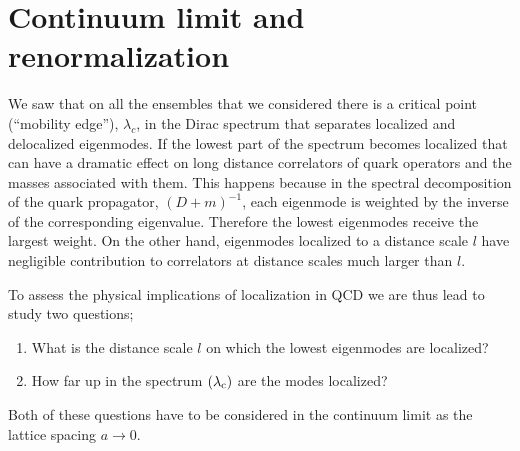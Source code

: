 \documentclass[twocolumn, prd, preprintnumbers, amsmath,
  amssymb, showpacs, floatfix]{revtex4-1}
\newcommand{\msub}[1]{\ensuremath _{\mbox{\scriptsize #1}}}
\begin{document}


\section{Continuum limit and renormalization}
    \label{se:Clar}

We saw that on all the ensembles that we considered there is a critical point
(``mobility edge''), $\lambda_c$, in the Dirac spectrum that separates
localized and delocalized eigenmodes. If the lowest part of the spectrum
becomes localized that can have a dramatic effect on long distance correlators
of quark operators and the masses associated with them. This happens because
in the spectral decomposition of the quark propagator, $(D+m)^{-1}$, each
eigenmode is weighted by the inverse of the corresponding
eigenvalue. Therefore the lowest eigenmodes receive the largest weight. On the
other hand, eigenmodes localized to a distance scale $l$ have negligible
contribution to correlators at distance scales much larger than $l$.

To assess the physical implications of localization in QCD we are thus lead to
study two questions;
\begin{enumerate}
 \item What is the distance scale $l$ on which the lowest eigenmodes are
   localized?
 \item How far up in the spectrum $(\lambda\msub{c})$ are the modes localized?
\end{enumerate}
Both of these questions have to be considered in the continuum limit as the
lattice spacing $a\rightarrow 0$.
\end{document}
